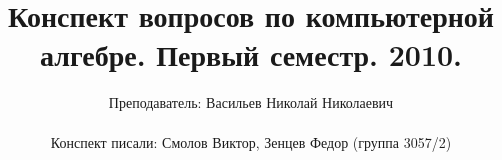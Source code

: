 



\title{Конспект вопросов по компьютерной алгебре. Первый семестр. 2010.}
\author{Преподаватель: Васильев Николай Николаевич \\ \\ 
        Конспект писали: Смолов Виктор, Зенцев Федор (группа 3057/2)}
\date{}
\maketitle
\thispagestyle{empty}

\pagebreak

\renewcommand{\cftsecleader}{\cftdotfill{\cftsubsecdotsep}}
\tableofcontents

\pagebreak




























